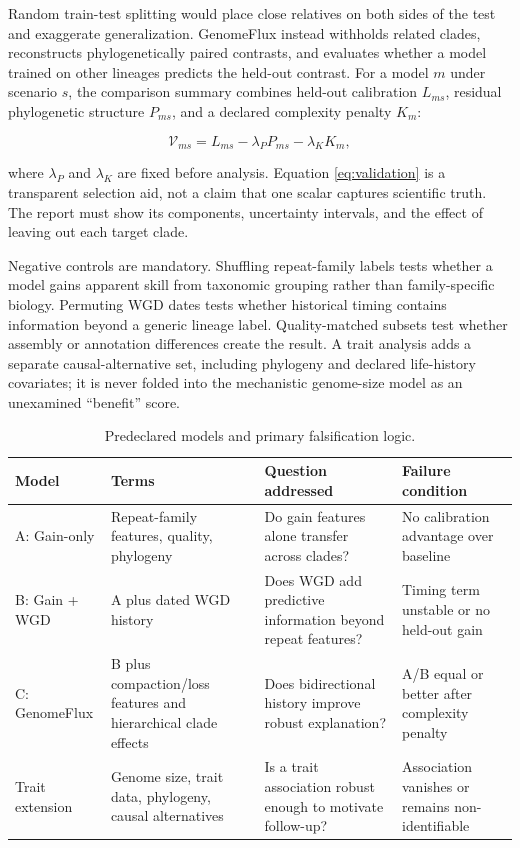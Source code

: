 \documentclass[conference]{IEEEtran}
\newcommand{\gf}{GenomeFlux}
\begin{document}
Random train-test splitting would place close relatives on both sides of the test and exaggerate generalization. \gf{} instead withholds related clades, reconstructs phylogenetically paired contrasts, and evaluates whether a model trained on other lineages predicts the held-out contrast. For a model $m$ under scenario $s$, the comparison summary combines held-out calibration $L_{ms}$, residual phylogenetic structure $P_{ms}$, and a declared complexity penalty $K_m$:

\begin{equation}
\mathcal{V}_{ms}=L_{ms}-\lambda_P P_{ms}-\lambda_K K_m,
\label{eq:validation}
\end{equation}

where $\lambda_P$ and $\lambda_K$ are fixed before analysis. Equation \eqref{eq:validation} is a transparent selection aid, not a claim that one scalar captures scientific truth. The report must show its components, uncertainty intervals, and the effect of leaving out each target clade.

Negative controls are mandatory. Shuffling repeat-family labels tests whether a model gains apparent skill from taxonomic grouping rather than family-specific biology. Permuting WGD dates tests whether historical timing contains information beyond a generic lineage label. Quality-matched subsets test whether assembly or annotation differences create the result. A trait analysis adds a separate causal-alternative set, including phylogeny and declared life-history covariates; it is never folded into the mechanistic genome-size model as an unexamined “benefit” score.

\begin{table}[t]
\caption{Predeclared models and primary falsification logic.}
\label{tab:models}
\centering
\scriptsize
\renewcommand{\arraystretch}{1.1}
\begin{tabular}{|p{}|p{}|p{}|p{}|}
\hline
\textbf{Model} & \textbf{Terms} & \textbf{Question addressed} & \textbf{Failure condition} \\
\hline
A: Gain-only & Repeat-family features, quality, phylogeny & Do gain features alone transfer across clades? & No calibration advantage over baseline \\
\hline
B: Gain + WGD & A plus dated WGD history & Does WGD add predictive information beyond repeat features? & Timing term unstable or no held-out gain \\
\hline
C: GenomeFlux & B plus compaction/loss features and hierarchical clade effects & Does bidirectional history improve robust explanation? & A/B equal or better after complexity penalty \\
\hline
Trait extension & Genome size, trait data, phylogeny, causal alternatives & Is a trait association robust enough to motivate follow-up? & Association vanishes or remains non-identifiable \\
\hline
\end{tabular}
\end{table}
\end{document}
